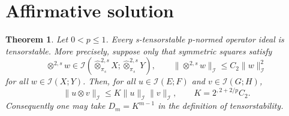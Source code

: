 \documentclass[11pt]{article}
\newtheorem{theorem}{Theorem}
\newcommand{\I}{\mathcal I}
\newcommand{\Sp}[1]{\widehat{\otimes}^{#1,s}_{\pi_s}}
\begin{document}
\section{Affirmative solution}

\begin{theorem}\label{thm:main}
Let $0<p\le1$. Every s-tensorstable $p$-normed operator ideal is
tensorstable. More precisely, suppose only that symmetric squares satisfy
\[
 \otimes^{2,s}w\in\I(\Sp{2}X;\Sp{2}Y),\qquad
 \|\otimes^{2,s}w\|_{\I}\le C_2\|w\|_{\I}^{2}
\]
for all $w\in\I(X;Y)$. Then, for all $u\in\I(E;F)$ and
$v\in\I(G;H)$,
\begin{equation}\label{eq:pair-bound}
 \|u\otimes v\|_{\I}
 \le K\|u\|_{\I}\|v\|_{\I},
 \qquad K=2^{,2+2/p}C_2.
\end{equation}
Consequently one may take $D_m=K^{m-1}$ in the definition of
tensorstability.
\end{theorem}
\end{document}
